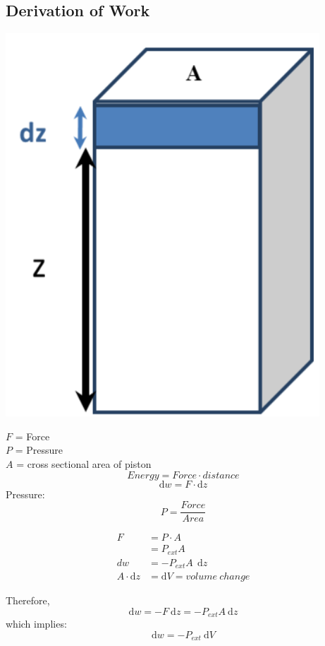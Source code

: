 \documentclass[10pt]{article}
\begin{document}
\subsection*{Derivation of Work}
\begin{center}
\includegraphics*[scale=0.5]{W3_5.png}
\end{center}
$F$ = Force\\
$P$ = Pressure\\
$A$ = cross sectional area of piston\\
\[Energy = Force \cdot distance\]
\[\text{d}w = F \cdot \text{d}z\]
Pressure:
\[P = \frac{Force}{Area}\]
\begin{center}
\begin{align*}
    F &= P \cdot A\\
    &= P_{ext}A\\
    dw &= -P_{ext}A\:\:\text{d}z\\
    A \cdot \text{d}z &= \text{d}V = volume\:change
\end{align*}
\end{center}
Therefore,
\[\text{d}w = -F \:\text{d}z = -P_{ext}A \:\text{d}z\]
which implies:
\[\text{d}w = -P_{ext} \:\text{d}V\]
\end{document}
